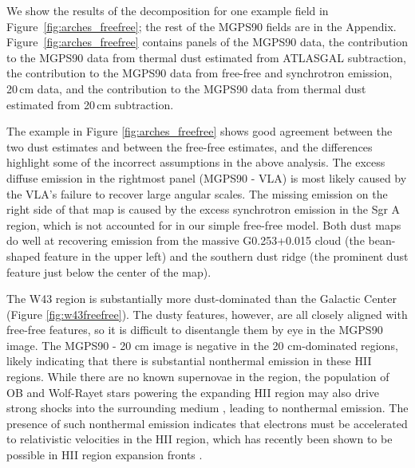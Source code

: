 \documentclass[twocolumn]{aastex62}
\begin{document}
We show the results of the decomposition for one example field in
Figure~\ref{fig:arches_freefree}; the rest of the MGPS90 fields are in the
Appendix.  Figure~\ref{fig:arches_freefree} contains panels of the MGPS90 data,
the contribution to the MGPS90 data from thermal dust estimated from ATLASGAL
subtraction, the contribution to the MGPS90 data from free-free and synchrotron
emission, 20\,cm data, and
the contribution to the MGPS90 data from thermal dust estimated from 20\,cm
subtraction.


The example in Figure \ref{fig:arches_freefree} shows good agreement between the
two dust estimates and between the free-free estimates, and the differences
highlight some of the incorrect assumptions in the above analysis.  The excess
diffuse emission in the rightmost panel (MGPS90 - VLA) is most likely caused by
the VLA's failure to recover large angular scales.  The missing emission on the
right side of that map is caused by the excess synchrotron emission in the Sgr
A region, which is not accounted for in our simple free-free model.  Both dust
maps do well at recovering emission from the massive G0.253+0.015 cloud (the bean-shaped
feature in the upper left) and the southern dust ridge (the prominent dust feature
just below the center of the map).

The W43 region is substantially more dust-dominated than the Galactic Center
(Figure \ref{fig:w43freefree}).  The dusty features, however, are all closely
aligned with free-free features, so it is difficult to disentangle them by eye
in the MGPS90 image.  The MGPS90 - 20 cm image is negative in the 20
cm-dominated regions, likely indicating that there is substantial nonthermal
emission in these HII regions.  While there are no known supernovae in the region, the population
of OB and Wolf-Rayet stars powering the expanding HII region may also
drive strong shocks into the surrounding medium \citep[e.g.][]{Bally2010a}, leading to nonthermal emission.
The presence of such nonthermal emission indicates that electrons must be
accelerated to relativistic velocities in the HII region, which has recently
been shown to be possible in HII region expansion fronts
\citep{Padovani2019a}.
\end{document}
